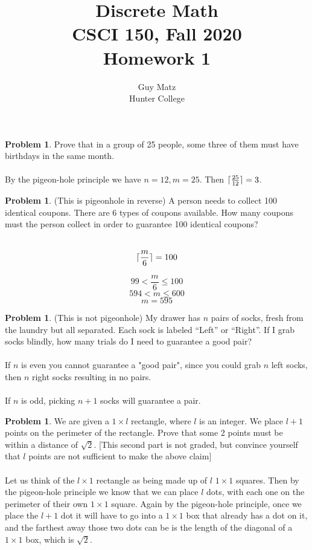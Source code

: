 \documentclass[10pt,leqno ]{article}
\title{Discrete Math\\
CSCI 150, Fall 2020\\
Homework 1}
\author{Guy Matz \\
Hunter College}
\theoremstyle{definition}
\newtheorem{problem}[theorem]{Problem}
\DeclarePairedDelimiter{\ceil}{\lceil}{\rceil}
\begin{document}
\begin{problem} Prove that in a group of 25 people, some three of them must have birthdays in the same month.
\\\\
\Large
By the pigeon-hole principle we have $n=12, m = 25$.  Then $\ceil{\frac{25}{12}}= 3$.
\end{problem}
\newpage

\begin{problem} (This  is  pigeonhole  in  reverse)  A  person  needs  to  collect  100  identical coupons.   There  are  6  types  of  coupons  available.   How  many  coupons must the person collect in order to guarantee 100 identical coupons?
\\\\
\Large

$$\ceil{\frac{m}{6}} = 100$$

$$99 < \frac{m}{6} \leq 100$$
$$594 < m \leq 600$$
$$m = 595$$

\end{problem}
\newpage

\begin{problem}  (This is not pigeonhole) My drawer has $n$ pairs of socks, fresh from the laundry but all separated.  Each sock is labeled “Left” or “Right”.  If I grab socks blindly, how many trials do I need to guarantee a good pair?
\\\\
\Large
If $n$ is even you cannot guarantee a "good pair", since you could grab $n$ left socks, then $n$ right socks resulting in no pairs.
\\\\
If $n$ is odd, picking $n+1$ socks will guarantee a pair.
\end{problem}
\newpage

\begin{problem} We  are  given  a  $1 \times l$ rectangle,  where $l$ is  an  integer.   We  place $l+ 1$ points on the perimeter of the rectangle.  Prove that some 2 points must be within a distance of $\sqrt{2}$.  [This second part is not graded, but convince yourself that $l$ points are not sufficient to make the above claim]
\\\\
\Large
Let us think of the $l \times 1$ rectangle as being made up of $l$ $1 \times 1$ squares. Then by the pigeon-hole principle we know that we can place $l$ dots, with each one on the perimeter of their own $1 \times 1$ square.  Again by the pigeon-hole principle, once we place the $l+1$ dot it will have to go into a $1 \times 1$ box that already has a dot on it, and the farthest away those two dots can be is the length of the diagonal of a $1\times 1$ box, which is $\sqrt{2}$.
\end{problem}
\newpage
\end{document}
